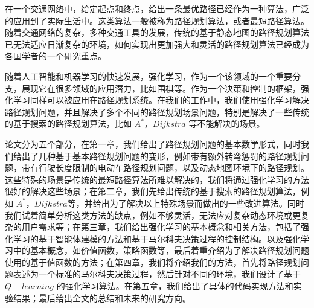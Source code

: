 \documentclass{standalone}
\begin{document}
	
\begin{chineseabstract}

在一个交通网络中，给定起点和终点，给出一条最优路径已经作为一种算法，广泛的应用到了实际生活中。这类算法一般被称为路径规划算法，或者最短路径算法。随着交通网络的复杂，多种交通工具的发展，传统的基于静态地图的路径规划算法已无法适应日渐复杂的环境，如何实现出更加强大和灵活的路径规划算法已经成为各国学者的一个研究重点。

随着人工智能和机器学习的快速发展，强化学习，作为一个该领域的一个重要分支，展现它在很多领域的应用潜力，比如围棋等。作为一个决策和控制的框架，强化学习同样可以被应用在路径规划系统。在我们的工作中，我们使用强化学习解决路径规划问题，并且解决了多个不同的路径规划场景问题，特别是解决了一些传统的基于搜索的路径规划算法，比如 $A^{*}$，$Dijkstra$ 等不能解决的场景。

论文分为五个部分，在第一章，我们给出了路径规划问题的基本数学形式，同时我们给出了几种基于基本路径规划问题的变形，例如带有额外转弯惩罚的路径规划问题，带有行驶长度限制的电动车路径规划问题，以及动态地图环境下的路径规划。这些特殊的场景是传统的最短路径算法所难以解决的，我们将通过强化学习的方法很好的解决这些场景；在第二章，我们先给出传统的基于搜索的路径规划算法，例如 $A^*，Dijkstra$等，并给出为了解决以上特殊场景而做出的一些改进算法。同时我们试着简单分析这类方法的缺点，例如不够灵活，无法应对复杂动态环境或更复杂的用户需求等；在第三章，我们给出强化学习的基本概念和相关方法，包括了强化学习的基于智能体建模的方法和基于马尔科夫决策过程的控制结构。以及强化学习中的基本概念，如价值函数，策略函数等，最后着重介绍为了解决路径规划问题使用的基于值函数的方法；在第四章，我们将介绍我们的方法，首先将路径规划问题表述为一个标准的马尔科夫决策过程，然后针对不同的环境，我们设计了基于 $Q-learning$ 的强化学习算法。在第五章，我们给出了具体的代码实现方法和实验结果；最后给出全文的总结和未来的研究方向。

\end{chineseabstract}
\end{document}
